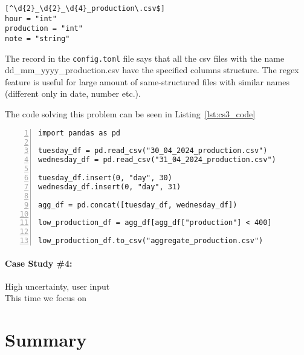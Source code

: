 \begin{lstlisting}[caption=config.toml of the second case study, label={lst:cs3_config}, captionpos=b]
[^\d{2}_\d{2}_\d{4}_production\.csv$]
hour = "int"
production = "int"
note = "string"
\end{lstlisting}

The record in the \verb|config.toml| file says that all the csv files with the name dd\_mm\_yyyy\_production.csv have the
specified columns structure.
The regex feature is useful for large amount of same-structured files with similar names (different only in date,
number etc.).

The code solving this problem can be seen in Listing~\ref{lst:cs3_code}

\begin{lstlisting}[caption=Solution of the third case study in Pandas, label={lst:cs3_code}, captionpos=b, numbers=left]
import pandas as pd

tuesday_df = pd.read_csv("30_04_2024_production.csv")
wednesday_df = pd.read_csv("31_04_2024_production.csv")

tuesday_df.insert(0, "day", 30)
wednesday_df.insert(0, "day", 31)

agg_df = pd.concat([tuesday_df, wednesday_df])

low_production_df = agg_df[agg_df["production"] < 400]

low_production_df.to_csv("aggregate_production.csv")
\end{lstlisting}

\paragraph{Case Study \#4:} High uncertainty, user input \\
This time we focus on


\section*{Summary}
